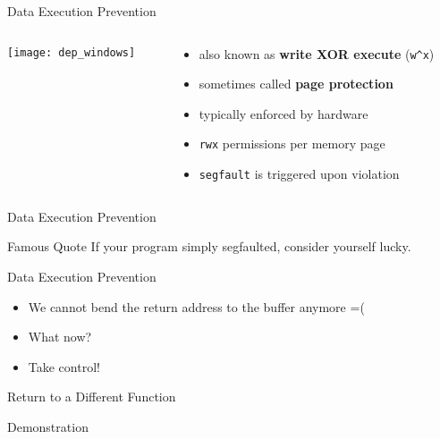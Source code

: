 \documentclass[beamer]{uibk}
\begin{document}
\begin{frame}{Data Execution Prevention}
    \begin{columns}
        \begin{column}{0.5\textwidth}
            \begin{center}
                \texttt{[image: dep\_windows]}
            \end{center}
        \end{column}
        \begin{column}{0.5\textwidth}
            \begin{itemize}
                \item also known as \textbf{write XOR execute} (\texttt{w\^{}x})
                \medskip
                \item sometimes called \textbf{page protection}
                \bigskip
                \item typically enforced by hardware
                \medskip
                \item \texttt{rwx} permissions per memory page
                \medskip
                \item \texttt{segfault} is triggered upon violation
            \end{itemize}
        \end{column}
    \end{columns}
\end{frame}

\begin{frame}{Data Execution Prevention}
    \begin{block}{Famous Quote}
        If your program simply segfaulted, consider yourself lucky.
    \end{block}
\end{frame}

\begin{frame}{Data Execution Prevention}
    \begin{itemize}
        \item We cannot bend the return address to the buffer anymore =(
        \item What now?
        \bigskip
        \pause
        \item Take control!
    \end{itemize}
\end{frame}

\begin{frame}{Return to a Different Function}
    \begin{center}
        \huge Demonstration
    \end{center}
\end{frame}
\end{document}
